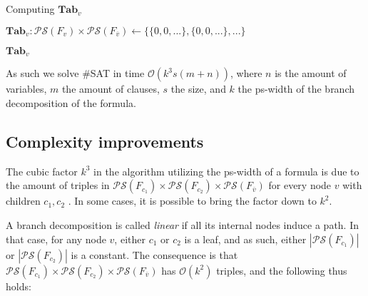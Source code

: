 \begin{algorithm}
	\LinesNumbered
	\caption{Computing $\mathbf{Tab}_v$ \cite{DBLP:conf/sat/SaetherTV14}}
	\label{alg:ps-tab-v}
	

	$\mathbf{Tab}_v : \mathcal{PS}(F_v) \times \mathcal{PS}(F_{\overline{v}}) \gets \{ \{ 0, 0, ... \}, \{ 0, 0, ... \}, ... \}$\; 
	
	\Return $\mathbf{Tab}_v$
\end{algorithm}

As such we solve \#SAT in time $\mathcal{O}(k^3s(m+n))$, where $n$ is the amount of variables, $m$ the amount of clauses, $s$ the size, and $k$ the ps-width of the branch decomposition of the formula.


\subsection{Complexity improvements}

The cubic factor $k^3$ in the algorithm utilizing the ps-width of a formula is due to the amount of triples in $\mathcal{PS}(F_{c_1}) \times \mathcal{PS}(F_{c_2}) \times \mathcal{PS}(F_{\overline{v}})$ for every node $v$ with children $c_1, c_2$ \cite{DBLP:conf/sat/SaetherTV14}.
In some cases, it is possible to bring the factor down to $k^2$.

A branch decomposition is called {\em linear} if all its internal nodes induce a path.
In that case, for any node $v$, either $c_1$ or $c_2$ is a leaf, and as such, either $|\mathcal{PS}(F_{c_1})|$ or $|\mathcal{PS}(F_{c_2})|$ is a constant.
The consequence is that $\mathcal{PS}(F_{c_1}) \times \mathcal{PS}(F_{c_2}) \times \mathcal{PS}(F_{\overline{v}})$ has $\mathcal{O}(k^2)$ triples, and the following thus holds:

